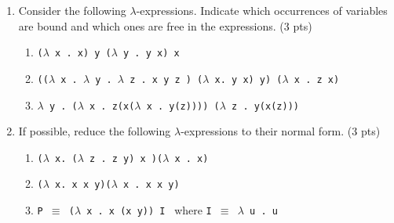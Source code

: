 \documentclass [11pt, a4wide, twoside]{article}
\begin{document}
\begin{enumerate}
\item Consider the following $\lambda$-expressions. Indicate which occurrences of
variables are bound and which ones are free in the expressions. (3 pts)
\begin{enumerate}
\item \texttt{($\lambda$ x .~x) y ($\lambda$ y .~y x) x}

\item \texttt{(($\lambda$ x .~$\lambda$ y .~$\lambda$ z .~x y z ) ($\lambda$ x. y x) y) ($\lambda$ x .~z x)}

\item \texttt{$\lambda$ y .~($\lambda$ x .~z(x($\lambda$ x .~y(z)))) ($\lambda$ z .~y(x(z)))}


\end{enumerate}


\item If possible, reduce the following $\lambda$-expressions to their normal form. (3 pts)

\begin{enumerate}
\item \texttt{($\lambda$ x. ($\lambda$ z . z y) x )($\lambda$ x . x)}
\item \texttt{($\lambda$ x. x x y)($\lambda$ x . x x y)}
\item \texttt{P $\equiv$ ($\lambda$ x .~x (x y)) I} ~where \texttt{I $\equiv$ $\lambda$ u .~u}
\end{enumerate}
\vspace{0.2cm}
\solution{\fontsize{9pt}{11pt}}


\end{enumerate}
\end{document}
